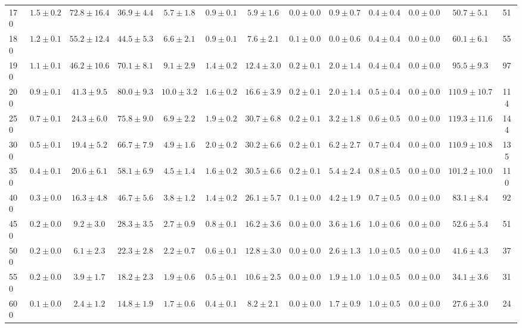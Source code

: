 \begin{table}[!htb]
{\begin{center}
\begin{tabular}{l | c c | c c c c c c c c  | c c}
170 & $1.5\pm0.2$ & $72.8\pm16.4$ & $36.9\pm4.4$ & $5.7\pm1.8$ & $0.9\pm0.1$ & $5.9\pm1.6$ & $0.0\pm0.0$ & $0.9\pm0.7$ & $0.4\pm0.4$ & $0.0\pm0.0$ & $50.7\pm5.1$ & 51 \\
180 & $1.2\pm0.1$ & $55.2\pm12.4$ & $44.5\pm5.3$ & $6.6\pm2.1$ & $0.9\pm0.1$ & $7.6\pm2.1$ & $0.1\pm0.0$ & $0.0\pm0.6$ & $0.4\pm0.4$ & $0.0\pm0.0$ & $60.1\pm6.1$ & 55 \\
190 & $1.1\pm0.1$ & $46.2\pm10.6$ & $70.1\pm8.1$ & $9.1\pm2.9$ & $1.4\pm0.2$ & $12.4\pm3.0$ & $0.2\pm0.1$ & $2.0\pm1.4$ & $0.4\pm0.4$ & $0.0\pm0.0$ & $95.5\pm9.3$ & 97 \\
200 & $0.9\pm0.1$ & $41.3\pm9.5$ & $80.0\pm9.3$ & $10.0\pm3.2$ & $1.6\pm0.2$ & $16.6\pm3.9$ & $0.2\pm0.1$ & $2.0\pm1.4$ & $0.5\pm0.4$ & $0.0\pm0.0$ & $110.9\pm10.7$ & 114 \\
250 & $0.7\pm0.1$ & $24.3\pm6.0$ & $75.8\pm9.0$ & $6.9\pm2.2$ & $1.9\pm0.2$ & $30.7\pm6.8$ & $0.2\pm0.1$ & $3.2\pm1.8$ & $0.6\pm0.5$ & $0.0\pm0.0$ & $119.3\pm11.6$ & 144 \\
300 & $0.5\pm0.1$ & $19.4\pm5.2$ & $66.7\pm7.9$ & $4.9\pm1.6$ & $2.0\pm0.2$ & $30.2\pm6.6$ & $0.2\pm0.1$ & $6.2\pm2.7$ & $0.7\pm0.4$ & $0.0\pm0.0$ & $110.9\pm10.8$ & 135 \\
350 & $0.4\pm0.1$ & $20.6\pm6.1$ & $58.1\pm6.9$ & $4.5\pm1.4$ & $1.6\pm0.2$ & $30.5\pm6.6$ & $0.2\pm0.1$ & $5.4\pm2.4$ & $0.8\pm0.5$ & $0.0\pm0.0$ & $101.2\pm10.0$ & 110 \\
400 & $0.3\pm0.0$ & $16.3\pm4.8$ & $46.7\pm5.6$ & $3.8\pm1.2$ & $1.4\pm0.2$ & $26.1\pm5.7$ & $0.1\pm0.0$ & $4.2\pm1.9$ & $0.7\pm0.5$ & $0.0\pm0.0$ & $83.1\pm8.4$ & 92 \\
450 & $0.2\pm0.0$ & $9.2\pm3.0$ & $28.3\pm3.5$ & $2.7\pm0.9$ & $0.8\pm0.1$ & $16.2\pm3.6$ & $0.0\pm0.0$ & $3.6\pm1.6$ & $1.0\pm0.6$ & $0.0\pm0.0$ & $52.6\pm5.4$ & 51 \\
500 & $0.2\pm0.0$ & $6.1\pm2.3$ & $22.3\pm2.8$ & $2.2\pm0.7$ & $0.6\pm0.1$ & $12.8\pm3.0$ & $0.0\pm0.0$ & $2.6\pm1.3$ & $1.0\pm0.5$ & $0.0\pm0.0$ & $41.6\pm4.3$ & 37 \\
550 & $0.2\pm0.0$ & $3.9\pm1.7$ & $18.2\pm2.3$ & $1.9\pm0.6$ & $0.5\pm0.1$ & $10.6\pm2.5$ & $0.0\pm0.0$ & $1.9\pm1.0$ & $1.0\pm0.5$ & $0.0\pm0.0$ & $34.1\pm3.6$ & 31 \\
600 & $0.1\pm0.0$ & $2.4\pm1.2$ & $14.8\pm1.9$ & $1.7\pm0.6$ & $0.4\pm0.1$ & $8.2\pm2.1$ & $0.0\pm0.0$ & $1.7\pm0.9$ & $1.0\pm0.5$ & $0.0\pm0.0$ & $27.6\pm3.0$ & 24 \\
 \hline
 \hline
\end{tabular}
\end{center}
}
\end{table}
